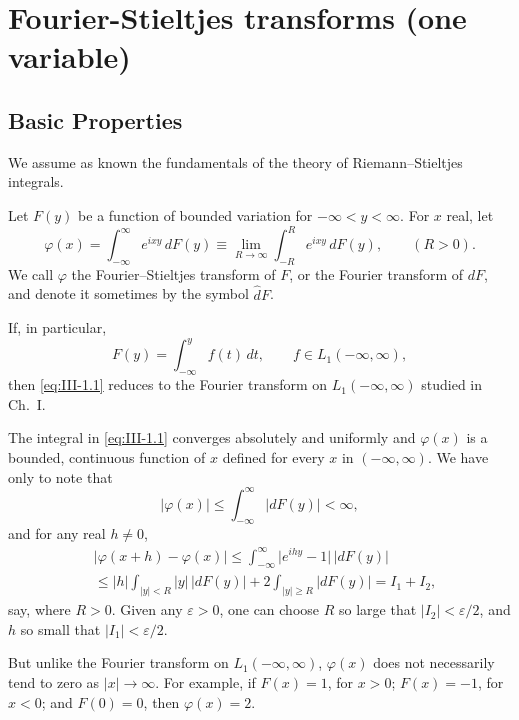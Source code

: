 \chapter{Fourier-Stieltjes transforms (one variable)}
\label{ch:III}

\section{Basic Properties}
\label{sec:III-1}

We assume as known the fundamentals of the theory of Riemann--Stieltjes integrals.

Let $F(y)$ be a function of bounded variation for $-\infty<y<\infty$. For $x$ real, let
\begin{equation}\tag{1.1}\label{eq:III-1.1}
\varphi(x)=\int_{-\infty}^{\infty}e^{ixy}\,dF(y)\equiv\lim_{R\to\infty}\int_{-R}^{R}e^{ixy}\,dF(y),\qquad(R>0).
\end{equation}
We call $\varphi$ the Fourier--Stieltjes transform of $F$, or the Fourier transform of $dF$, and denote it sometimes by the symbol $\hat dF$.

If, in particular,
\begin{equation}\tag{1.2}\label{eq:III-1.2}
F(y)=\int_{-\infty}^{y}f(t)\,dt,\qquad f\in L_{1}(-\infty,\infty),
\end{equation}
then \eqref{eq:III-1.1} reduces to the Fourier transform on $L_{1}(-\infty,\infty)$ studied in Ch.~I.

The integral in \eqref{eq:III-1.1} converges absolutely and uniformly and $\varphi(x)$ is a bounded, continuous function of $x$ defined for every $x$ in $(-\infty,\infty)$. We have only to note that
\[
\bigl|\varphi(x)\bigr|\le\int_{-\infty}^{\infty}\bigl|dF(y)\bigr|<\infty,
\]
and for any real $h\neq0$,
\begin{align*}
&\bigl|\varphi(x+h)-\varphi(x)\bigr|
\le\int_{-\infty}^{\infty}\bigl|e^{ihy}-1\bigr|\,\bigl|dF(y)\bigr|\\
&\le|h|\int_{|y|<R}|y|\,\bigl|dF(y)\bigr|+2\int_{|y|\ge R}\bigl|dF(y)\bigr|=I_{1}+I_{2},
\end{align*}
say, where $R>0$. Given any $\varepsilon>0$, one can choose $R$ so large that $|I_{2}|<\varepsilon/2$, and $h$ so small that $|I_{1}|<\varepsilon/2$.

But unlike the Fourier transform on $L_{1}(-\infty,\infty)$, $\varphi(x)$ does not necessarily tend to zero as $|x|\to\infty$. For example, if $F(x)=1$, for $x>0$; $F(x)=-1$, for $x<0$; and $F(0)=0$, then $\varphi(x)=2$.

